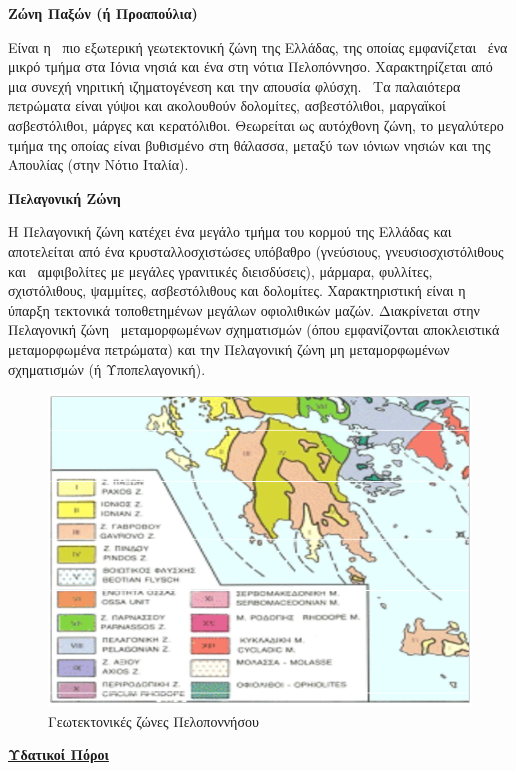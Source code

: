 \documentclass[12pt]{article}
\begin{document}
	\textbf{Ζώνη Παξών (ή Προαπούλια)}
	
	Είναι η  πιο εξωτερική γεωτεκτονική ζώνη της Ελλάδας, της οποίας εμφανίζεται  ένα μικρό τμήμα στα Ιόνια νησιά και ένα στη νότια Πελοπόννησο. Χαρακτηρίζεται από μια συνεχή νηριτική ιζηματογένεση και την απουσία φλύσχη.  Τα παλαιότερα πετρώματα είναι γύψοι και ακολουθούν δολομίτες, ασβεστόλιθοι, μαργαϊκοί ασβεστόλιθοι, μάργες και κερατόλιθοι. Θεωρείται ως αυτόχθονη ζώνη, το μεγαλύτερο τμήμα της οποίας είναι βυθισμένο στη θάλασσα, μεταξύ των ιόνιων νησιών και της Απουλίας (στην Νότιο Ιταλία).
	
	\textbf{Πελαγονική Ζώνη}
	
	Η Πελαγονική ζώνη κατέχει ένα μεγάλο τμήμα του κορμού της Ελλάδας και αποτελείται από ένα κρυσταλλοσχιστώσες υπόβαθρο (γνεύσιους, γνευσιοσχιστόλιθους και  αμφιβολίτες με μεγάλες γρανιτικές διεισδύσεις), μάρμαρα, φυλλίτες, σχιστόλιθους, ψαμμίτες, ασβεστόλιθους και δολομίτες. Χαρακτηριστική είναι η ύπαρξη τεκτονικά τοποθετημένων μεγάλων οφιολιθικών μαζών. Διακρίνεται στην Πελαγονική ζώνη  μεταμορφωμένων σχηματισμών (όπου εμφανίζονται αποκλειστικά μεταμορφωμένα πετρώματα) και την Πελαγονική ζώνη μη μεταμορφωμένων σχηματισμών (ή Υποπελαγονική).
	
	\begin{figure} [H]
		\begin{center}
			\includegraphics [scale = 0.75] {geotektonikes.png}
			\caption{Γεωτεκτονικές ζώνες Πελοποννήσου}
			\label{geotektonikes}
		\end{center}
	\end{figure}

	\textbf{\underline{Υδατικοί Πόροι}}
	
\end{document}
